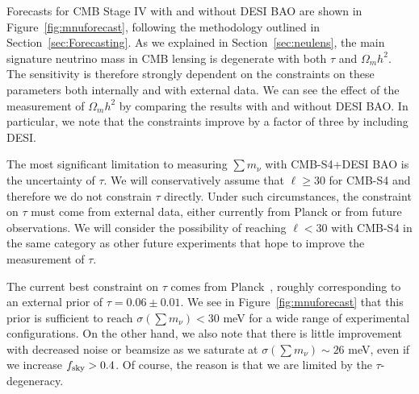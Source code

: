  

Forecasts for CMB Stage IV with and without DESI BAO are shown in Figure~\ref{fig:mnuforecast}, following the methodology outlined in Section~\ref{sec:Forecasting}.  As we explained in Section~\ref{sec:neulens}, the main signature neutrino mass in CMB lensing is degenerate with both $\tau$ and $\Omega_m h^2$.  The sensitivity is therefore strongly dependent on the constraints on these parameters both internally and with external data.  We can see the effect of the measurement of $\Omega_m h^2$ by comparing the results with and without DESI BAO.  In particular, we note that the constraints improve by a factor of three by including DESI.

The most significant limitation to measuring $\sum m_\nu$ with CMB-S4+DESI BAO is the uncertainty of $\tau$.  We will conservatively assume that $\ell \geq 30$ for CMB-S4 and therefore we do not constrain $\tau$ directly.  Under such circumstances, the constraint on $\tau$ must come from external data, either currently from Planck or from future observations.  We will consider the possibility of reaching $\ell < 30$ with CMB-S4 in the same category as other future experiments that hope to improve the measurement of $\tau$.

The current best constraint on $\tau$ comes from Planck~\cite{Adam:2016hgk}, roughly
corresponding to an external prior of
 $\tau = 0.06 \pm 0.01$.  We see in Figure~\ref{fig:mnuforecast} that
 this prior is sufficient to reach $\sigma(\sum m_\nu) < 30$ meV for a wide range of experimental configurations.  On the other hand, we also note that there is little improvement with decreased noise or beamsize as we saturate at $\sigma(\sum m_\nu) \sim 26$ meV,  even if we increase $f_{\rm sky} >0.4$.  Of course, the reason is that we are limited by the $\tau$-degeneracy.

